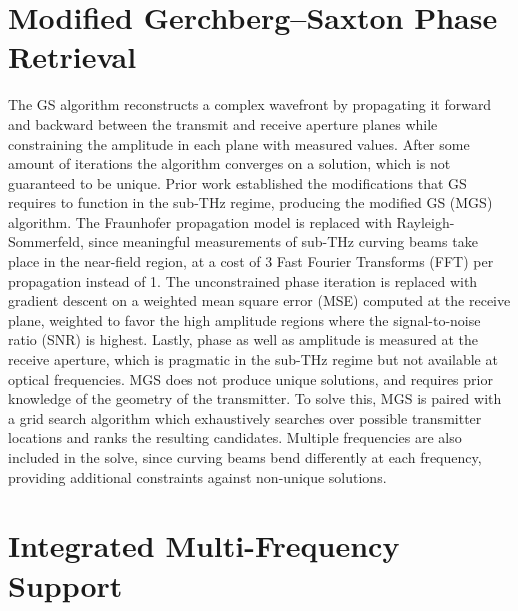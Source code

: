 \documentclass[11pt]{IEEEtran}
\begin{document}
\section{Modified Gerchberg--Saxton Phase Retrieval}

The GS algorithm reconstructs a complex wavefront by propagating it forward and backward between the transmit and receive aperture planes while constraining the amplitude in each plane with measured values\cite{generic_mgs}.
After some amount of iterations the algorithm converges on a solution, which is not guaranteed to be unique\cite{generic_mgs}.
Prior work established the modifications that GS requires to function in the sub-THz regime, producing the modified GS (MGS) algorithm.
The Fraunhofer propagation model is replaced with Rayleigh-Sommerfeld, since meaningful measurements of sub-THz curving beams take place in the near-field region, at a cost of 3 Fast Fourier Transforms (FFT) per propagation instead of 1\cite{mmwave_phase_retrieval, rs_impl}.
The unconstrained phase iteration is replaced with gradient descent on a weighted mean square error (MSE) computed at the receive plane, weighted to favor the high amplitude regions where the signal-to-noise ratio (SNR) is highest\cite{mgs_descent}.
Lastly, phase as well as amplitude is measured at the receive aperture, which is pragmatic in the sub-THz regime but not available at optical frequencies.
MGS does not produce unique solutions, and requires prior knowledge of the geometry of the transmitter.
To solve this, MGS is paired with a grid search algorithm which exhaustively searches over possible transmitter locations and ranks the resulting candidates.
Multiple frequencies are also included in the solve, since curving beams bend differently at each frequency, providing additional constraints against non-unique solutions.

\section{Integrated Multi-Frequency Support}
\end{document}

